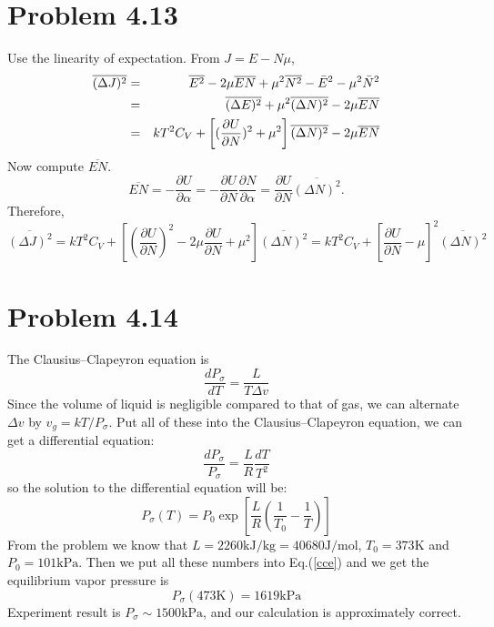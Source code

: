 \documentclass{article}
\begin{document}
\section*{Problem 4.13}
Use the linearity of expectation. From $J=E-N \mu$,
\begin{eqnarray}
\overline{(\Delta J)^{2}} &=& \overline{E^{2}} - 2 \mu \overline{EN} + \mu^{2} \overline{N^{2}} - \bar{E}^{2} - \mu^{2} \bar{N}^{2} \notag \\
&=& \overline{(\Delta E)^{2}} + \mu^{2} \overline{(\Delta N)^{2}} - 2 \mu \overline{EN}\notag  \\
&=& kT^{2} C_{V} + \left[ (\frac{\partial U}{\partial N})^{2} + \mu^{2}  \right]\overline{(\Delta N)^{2}}  - 2 \mu \overline{EN}
\end{eqnarray}
Now compute $\overline{EN} $.
\begin{equation}
\overline{EN} = -\frac{\partial U}{\partial \alpha} = - \frac{\partial U}{\partial N} \frac{\partial N}{\partial \alpha} = \frac{\partial U}{\partial N} \overline{(\Delta N)^{2}}.
\end{equation}
Therefore,
\begin{equation}
\overline{(\Delta J)^{2}} = kT^{2} C_{V} + \left[ (\frac{\partial U}{\partial N})^{2} - 2\mu \frac{\partial U}{\partial N}+ \mu^{2}  \right]\overline{(\Delta N)^{2}} = kT^{2} C_{V} + 
\left[\frac{\partial U}{\partial N} - \mu \right]^{2} \overline{(\Delta N)^{2}}
\end{equation}

\section*{Problem 4.14}
The Clausius–Clapeyron equation is
$$
\frac{dP_\sigma}{dT} = \frac{L}{T\Delta v}
$$
Since the volume of liquid is negligible compared to that of gas, we can alternate $\Delta v$ by $v_g = kT/P_\sigma$. Put all of these into the Clausius–Clapeyron equation, we can get a differential equation:
\begin{equation}
\frac{dP_\sigma}{P_\sigma} = \frac{L}{R}\frac{dT}{T^2}
\end{equation}
so the solution to the differential equation will be:
\begin{equation}\label{cce}
P_\sigma(T) = P_0\exp\left[\frac{L}{R}\left(\frac{1}{T_0}-\frac{1}{T}\right)\right]
\end{equation}
From the problem we know that $L = 2260\mathrm{kJ/kg} = 40680\mathrm{J/mol}$, $T_0 =373\mathrm{K}$ and $P_0 = 101\mathrm{kPa}$. Then we put all these numbers into Eq.(\ref{cce}) and we get the equilibrium vapor pressure is
$$
P_\sigma(473\mathrm{K}) = 1619\mathrm{kPa}
$$
Experiment result is $P_\sigma \sim 1500\mathrm{kPa}$, and our calculation is approximately correct.
\end{document}
